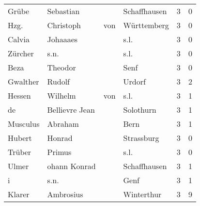 \begin{center}
\begin{tiny}
\begin{longtabu}{llllrr}
                    Grübe &                          Sebastian &             &                                Schaffhausen &          3 &         0 \\
                     Hzg. &                          Christoph &         von &                                 Württemberg &          3 &         0 \\
                   Calvia &                           Johaaaes &             &                                        s.l. &          3 &         0 \\
                  Zürcher &                               s.n. &             &                                        s.l. &          3 &         0 \\
                     Beza &                            Theodor &             &                                        Senf &          3 &         0 \\
                 Gwalther &                             Rudolf &             &                                      Urdorf &          3 &         2 \\
                   Hessen &                            Wilhelm &         von &                                        s.l. &          3 &         1 \\
                       de &                     Bellievre Jean &             &                                   Solothurn &          3 &         1 \\
                 Musculus &                            Abraham &             &                                        Bern &          3 &         1 \\
                   Hubert &                             Honrad &             &                                  Strassburg &          3 &         0 \\
                   Trüber &                             Primus &             &                                        s.l. &          3 &         0 \\
                    Ulmer &                       ohann Konrad &             &                                Schaffhausen &          3 &         1 \\
                        i &                               s.n. &             &                                        Genf &          3 &         1 \\
                   Klarer &                          Ambrosius &             &                                  Winterthur &          3 &         9 \\

\end{longtabu}
\end{tiny}
\end{center}
